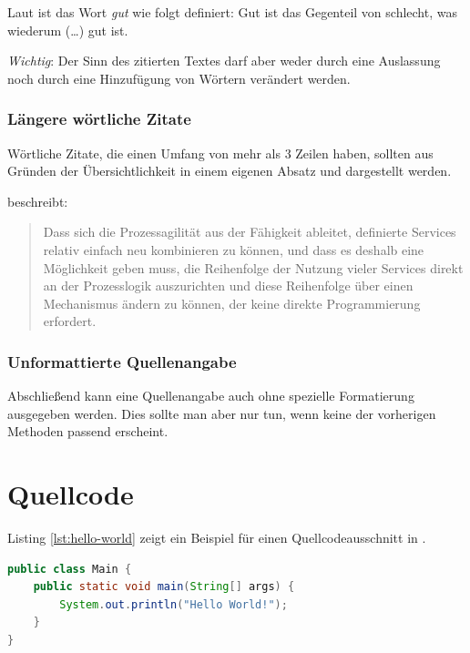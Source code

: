 Laut \textcite[55-56]{angenendt} ist das Wort \emph{gut} wie folgt definiert: \glqq Gut ist das Gegenteil von schlecht, was wiederum (\dots) gut ist.\grqq

\emph{Wichtig}: Der Sinn des zitierten Textes darf aber weder durch eine Auslassung noch durch eine Hinzufügung von Wörtern verändert werden.


\subsubsection{Längere wörtliche Zitate}

Wörtliche Zitate, die einen Umfang von mehr als 3 Zeilen haben, sollten aus Gründen der Übersichtlichkeit in einem eigenen Absatz und dargestellt werden.

\textcite[85]{angenendt} beschreibt:

\begin{quote}
Dass sich die Prozessagilität aus der Fähigkeit ableitet, definierte Services relativ einfach neu kombinieren zu können, und dass es deshalb eine Möglichkeit geben muss, die Reihenfolge der Nutzung vieler Services direkt an der Prozesslogik auszurichten und diese Reihenfolge über einen Mechanismus ändern zu können, der keine direkte Programmierung erfordert.
\end{quote}


\subsubsection{Unformattierte Quellenangabe}

Abschließend kann eine Quellenangabe auch ohne spezielle Formatierung ausgegeben werden. Dies sollte man aber nur tun, wenn keine der vorherigen Methoden passend erscheint. \cite[100-101]{angenendt}


\section{Quellcode}

Listing \vref{lst:hello-world} zeigt ein Beispiel für einen Quellcodeausschnitt in \latex.

\begin{lstlisting}[language=Java, caption={Hello World in Java}, label=lst:hello-world]
public class Main {
	public static void main(String[] args) {
		System.out.println("Hello World!");
	}
}
\end{lstlisting}
